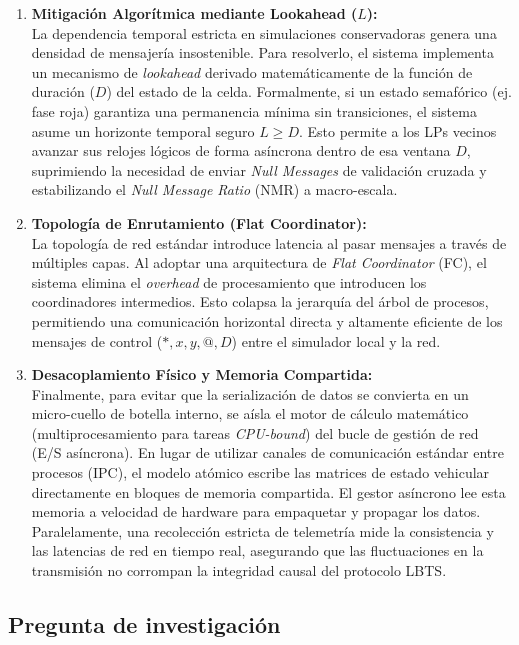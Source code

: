 \documentclass[12pt]{article}
\begin{document}
\begin{enumerate}
    \item \textbf{Mitigación Algorítmica mediante Lookahead ($L$):} \\
    La dependencia temporal estricta en simulaciones conservadoras genera una densidad de mensajería insostenible. Para resolverlo, el sistema implementa un mecanismo de \textit{lookahead} derivado matemáticamente de la función de duración ($D$) del estado de la celda. Formalmente, si un estado semafórico (ej. fase roja) garantiza una permanencia mínima sin transiciones, el sistema asume un horizonte temporal seguro $L \ge D$. Esto permite a los LPs vecinos avanzar sus relojes lógicos de forma asíncrona dentro de esa ventana $D$, suprimiendo la necesidad de enviar \textit{Null Messages} de validación cruzada y estabilizando el \textit{Null Message Ratio} (NMR) a macro-escala.

    \item \textbf{Topología de Enrutamiento (Flat Coordinator):} \\
    La topología de red estándar introduce latencia al pasar mensajes a través de múltiples capas. Al adoptar una arquitectura de \textit{Flat Coordinator} (FC), el sistema elimina el \textit{overhead} de procesamiento que introducen los coordinadores intermedios. Esto colapsa la jerarquía del árbol de procesos, permitiendo una comunicación horizontal directa y altamente eficiente de los mensajes de control ($\ast, x, y, @, D$) entre el simulador local y la red.

    \item \textbf{Desacoplamiento Físico y Memoria Compartida:} \\
    Finalmente, para evitar que la serialización de datos se convierta en un micro-cuello de botella interno, se aísla el motor de cálculo matemático (multiprocesamiento para tareas \textit{CPU-bound}) del bucle de gestión de red (E/S asíncrona). En lugar de utilizar canales de comunicación estándar entre procesos (IPC), el modelo atómico escribe las matrices de estado vehicular directamente en bloques de memoria compartida. El gestor asíncrono lee esta memoria a velocidad de hardware para empaquetar y propagar los datos. Paralelamente, una recolección estricta de telemetría mide la consistencia y las latencias de red en tiempo real, asegurando que las fluctuaciones en la transmisión no corrompan la integridad causal del protocolo LBTS.
\end{enumerate}

\subsection{Pregunta de investigación}
\end{document}
